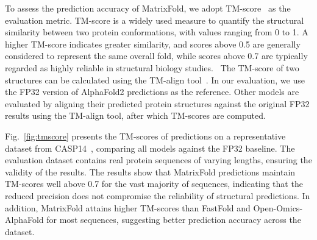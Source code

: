 To assess the prediction accuracy of MatrixFold, we adopt TM-score~\cite{zhang2004scoring} as the evaluation metric. TM-score is a widely used measure to quantify the structural similarity between two protein conformations, with values ranging from 0 to 1. A higher TM-score indicates greater similarity, and scores above 0.5 are generally considered to represent the same overall fold, while scores above 0.7 are typically regarded as highly reliable in structural biology studies.~\cite{xu2010significant} The TM-score of two structures can be calculated using the TM-align tool~\cite{zhang2005tm}.
In our evaluation, we use the FP32 version of AlphaFold2 predictions as the reference. Other models are evaluated by aligning their predicted protein structures against the original FP32 results using the TM-align tool, after which TM-scores are computed.

Fig.~\ref{fig:tmscore} presents the TM-scores of predictions on a representative dataset from CASP14~\cite{casp14}, comparing all models against the FP32 baseline. The evaluation dataset contains real protein sequences of varying lengths, ensuring the validity of the results. The results show that MatrixFold predictions maintain TM-scores well above 0.7 for the vast majority of sequences, indicating that the reduced precision does not compromise the reliability of structural predictions.
In addition, MatrixFold attains higher TM-scores than FastFold and Open-Omics-AlphaFold for most sequences, suggesting better prediction accuracy across the dataset.



